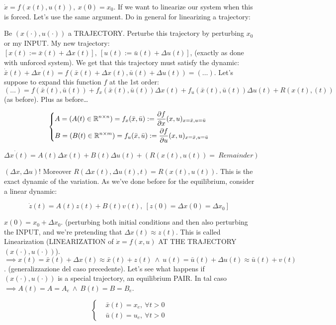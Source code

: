 $\dot{x}=f(x(t),u(t)),\ x(0) = x_0$. If we want to linearize our system when this is forced. Let's use the same argument. Do in general for linearizing a trajectory:

Be $(x(\mathord{\cdot}),u(\mathord{\cdot}))$ a TRAJECTORY. Perturbe this trajectory by perturbing $x_0$ or my INPUT. My new trajectory: $[x(t) := \bar{x}(t) + \Delta x(t)],\ [u(t) := \bar{u}(t) + \Delta u(t)]$, (exactly as done with unforced system). We get that this trajectory must satisfy the dynamic: $\dot{\bar{x}}(t) + \dot{\Delta x(t)} = f(\bar{x}(t) + \Delta x(t), \bar{u}(t) + \Delta u(t)) = (\dots)$. Let's suppose to expand this function $f$ at the 1st order: $(\dots) = f(\bar{x}(t),\bar{u}(t)) + f_x(\bar{x}(t),\bar{u}(t))\Delta x(t) + f_u(\bar{x}(t), \bar{u}(t))\Delta u(t) + R(x(t),(t))$ (as before). Plus as before\dots


\[
	\left\{
	\begin{aligned}
	&A = (A(t) \in \mathbb{R}^{n\times n}) = f_x(\bar{x},\bar{u}) := \frac{\partial{f}}{\partial{x}}(x,u)_{x=\bar{x},u=\bar{u}} \\
	&B = (B(t) \in \mathbb{R}^{n\times m}) = f_u(\bar{x},\bar{u}) := \frac{\partial{f}}{\partial{u}}(x,u)_{x=\bar{x},u=\bar{u}}
	\end{aligned} 
	\right.
\]

\[
	\dot{\Delta x(t)} = A(t)\Delta x(t) + B(t)\Delta u(t) + (R(x(t),u(t))=\ Remainder)
\]

$(\Delta x, \Delta u)$! Moreover $R(\Delta x(t), \Delta u(t), t) = R(x(t),u(t))$. This is the exact dynamic of the variation. As we've done before for the equilibrium, consider a linear dynamic:

\[
	\dot{z}(t) = A(t)z(t) + B(t)v(t),\ [z(0) = \Delta x(0) = \Delta x_0]
\]

$x(0) = x_0 + \Delta x_0$. (perturbing both initial conditions and then also perturbing the INPUT, and we're pretending that $\Delta x(t) \approx z(t)$. This is called Linearization (LINEARIZATION of $\dot{x}=f(x,u)$ AT THE TRAJECTORY $(x(\mathord{\cdot}),u(\mathord{\cdot}))$). $\implies x(t) = \bar{x}(t) + \Delta x(t) \approx \bar{x}(t) + z(t)\ \land\ u(t) = \bar{u}(t) + \Delta u(t) \approx \bar{u}(t) + v(t)$. (generalizzazione del caso precedente). Let's see what happens if $(x(\mathord{\cdot}),u(\mathord{\cdot}))$ is a special trajectory, an equilibrium PAIR. In tal caso $\implies A(t) = A = A_e\ \land\ B(t) = B = B_e$.

\[
	\left\{
	\begin{aligned}
	&\bar{x}(t) = x_e,\ \forall t > 0 \\
	&\bar{u}(t) = u_e,\ \forall t > 0
	\end{aligned} 
	\right.
\]

